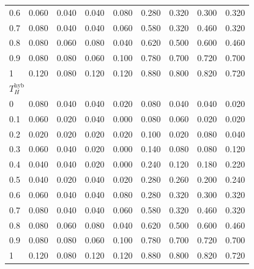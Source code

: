 \begin{table}[htbp]
\begin{tabular}{lcccccccc}
0.6 & 0.060 & 0.040 & 0.040 & 0.080 & 0.280 & 0.320 & 0.300 & 0.320 \\
0.7 & 0.080 & 0.040 & 0.040 & 0.060 & 0.580 & 0.320 & 0.460 & 0.320 \\
0.8 & 0.080 & 0.060 & 0.080 & 0.040 & 0.620 & 0.500 & 0.600 & 0.460 \\
0.9 & 0.080 & 0.080 & 0.060 & 0.100 & 0.780 & 0.700 & 0.720 & 0.700 \\
1 & 0.120 & 0.080 & 0.120 & 0.120 & 0.880 & 0.800 & 0.820 & 0.720 \\
\midrule
\multicolumn{9}{l}{\textit{$T_H^{\mathrm{hyb}}$}} \\
0 & 0.080 & 0.040 & 0.040 & 0.020 & 0.080 & 0.040 & 0.040 & 0.020 \\
0.1 & 0.060 & 0.020 & 0.040 & 0.000 & 0.080 & 0.060 & 0.020 & 0.020 \\
0.2 & 0.020 & 0.020 & 0.020 & 0.020 & 0.100 & 0.020 & 0.080 & 0.040 \\
0.3 & 0.060 & 0.040 & 0.020 & 0.000 & 0.140 & 0.080 & 0.080 & 0.120 \\
0.4 & 0.040 & 0.040 & 0.020 & 0.000 & 0.240 & 0.120 & 0.180 & 0.220 \\
0.5 & 0.040 & 0.020 & 0.040 & 0.020 & 0.280 & 0.260 & 0.200 & 0.240 \\
0.6 & 0.060 & 0.040 & 0.040 & 0.080 & 0.280 & 0.320 & 0.300 & 0.320 \\
0.7 & 0.080 & 0.040 & 0.040 & 0.060 & 0.580 & 0.320 & 0.460 & 0.320 \\
0.8 & 0.080 & 0.060 & 0.080 & 0.040 & 0.620 & 0.500 & 0.600 & 0.460 \\
0.9 & 0.080 & 0.080 & 0.060 & 0.100 & 0.780 & 0.700 & 0.720 & 0.700 \\
1 & 0.120 & 0.080 & 0.120 & 0.120 & 0.880 & 0.800 & 0.820 & 0.720 \\
\bottomrule
\end{tabular}
\par\smallskip

\end{table}
